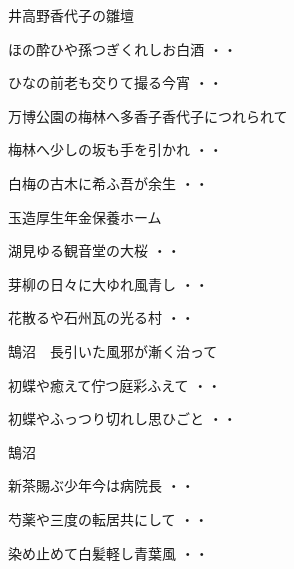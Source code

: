 \vspace{0.6cm}
井高野香代子の雛壇
\begin{shiika}ほの酔ひや孫つぎくれしお白酒
\hfill{・・}\end{shiika}
\begin{shiika}ひなの前老も交りて撮る今宵
\hfill{・・}\end{shiika}
\vspace{0.6cm}
万博公園の梅林へ多香子香代子につれられて
\begin{shiika}梅林へ少しの坂も手を引かれ
\hfill{・・}\end{shiika}
\begin{shiika}白梅の古木に希ふ吾が余生
\hfill{・・}\end{shiika}
\vspace{0.6cm}
玉造厚生年金保養ホーム
\begin{shiika}湖見ゆる観音堂の大桜
\hfill{・・}\end{shiika}
\begin{shiika}芽柳の日々に大ゆれ風青し
\hfill{・・}\end{shiika}
\begin{shiika}花散るや石州瓦の光る村
\hfill{・・}\end{shiika}
\vspace{0.6cm}
鵠沼　長引いた風邪が漸く治って
\begin{shiika}初蝶や癒えて佇つ庭彩ふえて
\hfill{・・}\end{shiika}
\begin{shiika}初蝶やふっつり切れし思ひごと
\hfill{・・}\end{shiika}
\vspace{0.6cm}
鵠沼
\begin{shiika}新茶賜ぶ少年今は病院長
\hfill{・・}\end{shiika}
\begin{shiika}芍薬や三度の転居共にして
\hfill{・・}\end{shiika}
\vspace{0.6cm}
\begin{shiika}染め止めて白髪軽し青葉風
\hfill{・・}\end{shiika}
